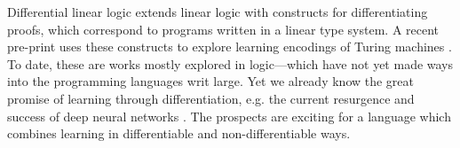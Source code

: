 Differential linear logic extends linear logic with constructs for differentiating proofs, which correspond to programs written in a linear type system.  A recent pre-print uses these constructs to explore learning encodings of Turing machines \cite{clift2018derivatives}. To date, these are works mostly explored in logic---which have not yet made ways into the programming languages writ large. Yet we already know the great promise of learning through differentiation, e.g. the current resurgence and success of deep neural networks \cite{lecun2015deep}. The prospects are exciting for a language which combines learning in differentiable and non-differentiable ways. 